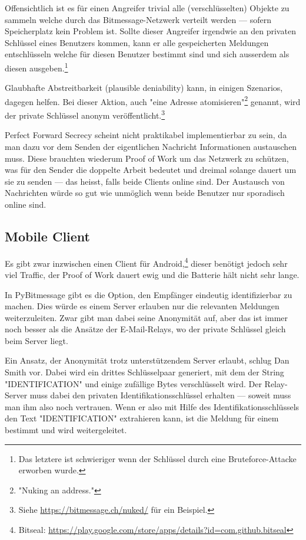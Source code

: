 \documentclass{bfh}
\begin{document}
  Offensichtlich ist es für einen Angreifer trivial alle (verschlüsselten) Objekte zu sammeln welche durch das Bitmessage-Netzwerk verteilt werden --- sofern Speicherplatz kein Problem ist. Sollte dieser Angreifer irgendwie an den privaten Schlüssel eines Benutzers kommen, kann er alle gespeicherten Meldungen entschlüsseln welche für diesen Benutzer bestimmt sind und sich ausserdem als diesen ausgeben.\footnote{Das letztere ist schwieriger wenn der Schlüssel durch eine Bruteforce-Attacke erworben wurde.}

  Glaubhafte Abstreitbarkeit (plausible deniability) kann, in einigen Szenarios, dagegen helfen. Bei dieser Aktion, auch "eine Adresse atomisieren"\footnote{"Nuking an address."} genannt, wird der private Schlüssel anonym veröffentlicht.\footnote{Siehe \url{https://bitmessage.ch/nuked/} für ein Beispiel.}

  Perfect Forward Secrecy scheint nicht praktikabel implementierbar zu sein, da man dazu vor dem Senden der eigentlichen Nachricht Informationen austauschen muss. Diese brauchten wiederum Proof of Work um das Netzwerk zu schützen, was für den Sender die doppelte Arbeit bedeutet und dreimal solange dauert um sie zu senden --- das heisst, falls beide Clients online sind. Der Austausch von Nachrichten würde so gut wie unmöglich wenn beide Benutzer nur sporadisch online sind.

  \subsection{Mobile Client}

  Es gibt zwar inzwischen einen Client für Android,\footnote{Bitseal: \url{https://play.google.com/store/apps/details?id=com.github.bitseal}} dieser benötigt jedoch sehr viel Traffic, der Proof of Work dauert ewig und die Batterie hält nicht sehr lange.

  In PyBitmessage gibt es die Option, den Empfänger eindeutig identifizierbar zu machen. Dies würde es einem Server erlauben nur die relevanten Meldungen weiterzuleiten. Zwar gibt man dabei seine Anonymität auf, aber das ist immer noch besser als die Ansätze der E-Mail-Relays, wo der private Schlüssel gleich beim Server liegt.

  Ein Ansatz, der Anonymität trotz unterstützendem Server erlaubt, schlug Dan Smith vor.\cite{forum:msg7871} Dabei wird ein drittes Schlüsselpaar generiert, mit dem der String "IDENTIFICATION" und einige zufällige Bytes verschlüsselt wird. Der Relay-Server muss dabei den privaten Identifikationsschlüssel erhalten --- soweit muss man ihm also noch vertrauen. Wenn er also mit Hilfe des Identifikationsschlüssels den Text "IDENTIFICATION" extrahieren kann, ist die Meldung für einem bestimmt und wird weitergeleitet.
\end{document}

